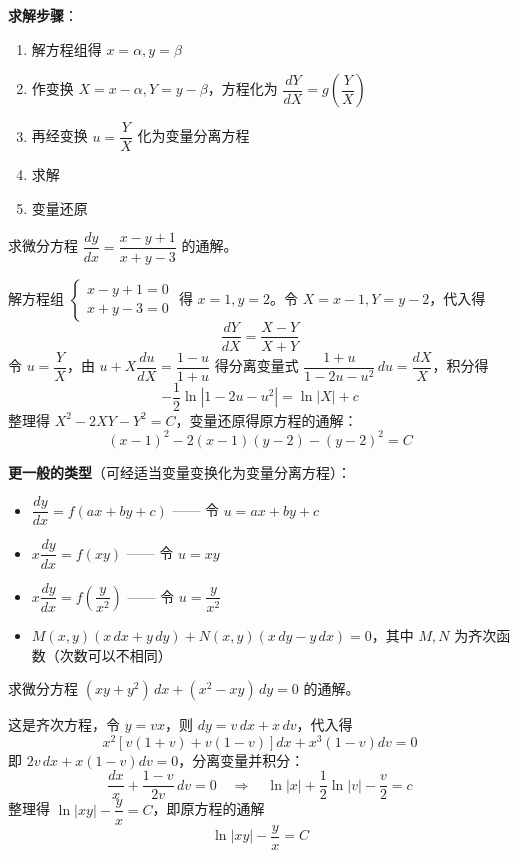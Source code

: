 \textbf{求解步骤}：
\begin{enumerate}
    \item 解方程组得 $x = \alpha, y = \beta$
    \item 作变换 $X = x - \alpha, Y = y - \beta$，方程化为 $\dfrac{dY}{dX} = g\left(\dfrac{Y}{X}\right)$
    \item 再经变换 $u = \dfrac{Y}{X}$ 化为变量分离方程
    \item 求解
    \item 变量还原
\end{enumerate}

\begin{example}
求微分方程 $\dfrac{dy}{dx} = \dfrac{x - y + 1}{x + y - 3}$ 的通解。
\end{example}

\begin{solution}
解方程组 $\begin{cases} x - y + 1 = 0 \\ x + y - 3 = 0 \end{cases}$ 得 $x = 1, y = 2$。令 $X = x - 1, Y = y - 2$，代入得
$$\frac{dY}{dX} = \frac{X - Y}{X + Y}$$
令 $u = \dfrac{Y}{X}$，由 $u + X\dfrac{du}{dX} = \dfrac{1-u}{1+u}$ 得分离变量式 $\dfrac{1+u}{1-2u-u^2}\,du = \dfrac{dX}{X}$，积分得
$$-\frac{1}{2}\ln|1-2u-u^2| = \ln|X| + c$$
整理得 $X^2 - 2XY - Y^2 = C$，变量还原得原方程的通解：
$$(x-1)^2 - 2(x-1)(y-2) - (y-2)^2 = C$$
\end{solution}

\textbf{更一般的类型}（可经适当变量变换化为变量分离方程）：
\begin{itemize}
    \item $\dfrac{dy}{dx} = f(ax + by + c)$ —— 令 $u = ax+by+c$
    \item $x\dfrac{dy}{dx} = f(xy)$ —— 令 $u = xy$
    \item $x\dfrac{dy}{dx} = f\left(\dfrac{y}{x^2}\right)$ —— 令 $u = \dfrac{y}{x^2}$
    \item $M(x,y)(x\,dx + y\,dy) + N(x,y)(x\,dy - y\,dx) = 0$，其中 $M, N$ 为齐次函数（次数可以不相同）
\end{itemize}

\begin{example}
求微分方程 $(xy + y^2)\,dx + (x^2 - xy)\,dy = 0$ 的通解。
\end{example}

\begin{solution}
这是齐次方程，令 $y = vx$，则 $dy = v\,dx + x\,dv$，代入得
$$x^2\left[v(1+v) + v(1-v)\right]dx + x^3(1-v)dv = 0$$
即 $2v\,dx + x(1-v)dv = 0$，分离变量并积分：
$$\frac{dx}{x} + \frac{1-v}{2v}\,dv = 0 \quad \Rightarrow \quad \ln|x| + \frac{1}{2}\ln|v| - \frac{v}{2} = c$$
整理得 $\ln|xy| - \dfrac{y}{x} = C$，即原方程的通解
$$\ln|xy| - \frac{y}{x} = C$$
\end{solution}

